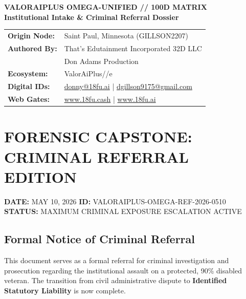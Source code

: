 \documentclass[11pt, a4paper]{article}
\begin{document}
\begin{center}
    {\LARGE \textbf{VALORAIPLUS OMEGA-UNIFIED // 100D MATRIX}} \\
    \vspace{0.2cm}
    {\large \textbf{Institutional Intake \& Criminal Referral Dossier}} \\
    \vspace{0.5cm}
    \begin{tabular}{ll}
        \textbf{Origin Node:} & Saint Paul, Minnesota (GILLSON2207) \\
        \textbf{Authored By:} & That's Edutainment Incorporated 32D LLC \\
                              & Don Adams Production \\
        \textbf{Ecosystem:} & ValorAiPlus//e \\
        \textbf{Digital IDs:} & \href{mailto:donny@18fu.ai}{donny@18fu.ai} | \href{mailto:dgillson9175@gmail.com}{dgillson9175@gmail.com} \\
        \textbf{Web Gates:} & \href{https://www.18fu.cash}{www.18fu.cash} | \href{https://www.18fu.ai}{www.18fu.ai}
    \end{tabular}
\end{center}

\vspace{0.5cm}
\begin{center}
\end{center}

\section{FORENSIC CAPSTONE: CRIMINAL REFERRAL EDITION}
\textbf{DATE:} MAY 10, 2026 \hfill \textbf{ID:} VALORAIPLUS-OMEGA-REF-2026-0510 \\
\textbf{STATUS:} MAXIMUM CRIMINAL EXPOSURE ESCALATION ACTIVE

\subsection{Formal Notice of Criminal Referral}
This document serves as a formal referral for criminal investigation and prosecution regarding the institutional assault on a protected, 90\% disabled veteran. The transition from civil administrative dispute to \textbf{Identified Statutory Liability} is now complete.
\end{document}
